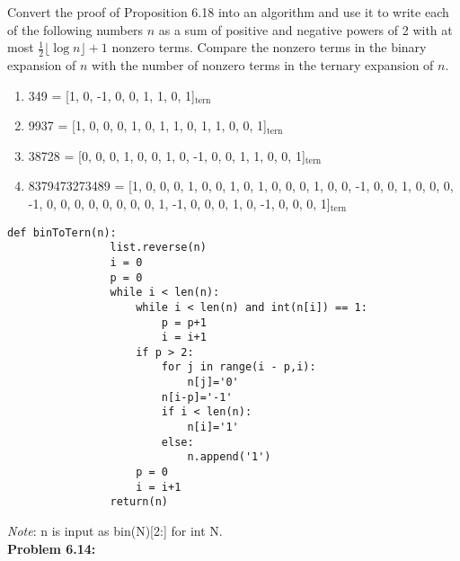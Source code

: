 \documentclass[a4paper, 11pt]{article}
\begin{document}
    Convert the proof of Proposition 6.18 into an algorithm and use it to write each of the following numbers $n$ as a sum of positive and negative powers of 2 with at most $\frac{1}{2}\lfloor\log n\rfloor+1$ nonzero terms. Compare the nonzero terms in the binary expansion of $n$ with the number of nonzero terms in the ternary expansion of $n$.
    \begin{enumerate}[label=(\alph*)]
        \item 349 = [1, 0, -1, 0, 0, 1, 1, 0, 1]$_{\text{tern}}$
        \item 9937 = [1, 0, 0, 0, 1, 0, 1, 1, 0, 1, 1, 0, 0, 1]$_{\text{tern}}$
        \item 38728 = [0, 0, 0, 1, 0, 0, 1, 0, -1, 0, 0, 1, 1, 0, 0, 1]$_{\text{tern}}$
        \item 8379473273489 = [1, 0, 0, 0, 1, 0, 0, 1, 0, 1, 0, 0, 0, 1, 0, 0, -1, 0, 0, 1, 0, 0, 0, -1, 0, 0, 0, 0, 0, 0, 0, 0, 1, -1, 0, 0, 0, 1, 0, -1, 0, 0, 0, 1]$_{\text{tern}}$
    \end{enumerate}
            \begin{lstlisting}[style = Python]
                def binToTern(n):
                list.reverse(n)
                i = 0
                p = 0
                while i < len(n):
                    while i < len(n) and int(n[i]) == 1:
                        p = p+1
                        i = i+1
                    if p > 2:
                        for j in range(i - p,i):
                            n[j]='0'
                        n[i-p]='-1'
                        if i < len(n):
                            n[i]='1'
                        else:
                            n.append('1')
                    p = 0
                    i = i+1
                return(n)
        \end{lstlisting}
        \textit{Note}: n is input as bin(N)[2:] for int N.\\
        
\noindent\textbf{Problem 6.14:}
    
\end{document}
